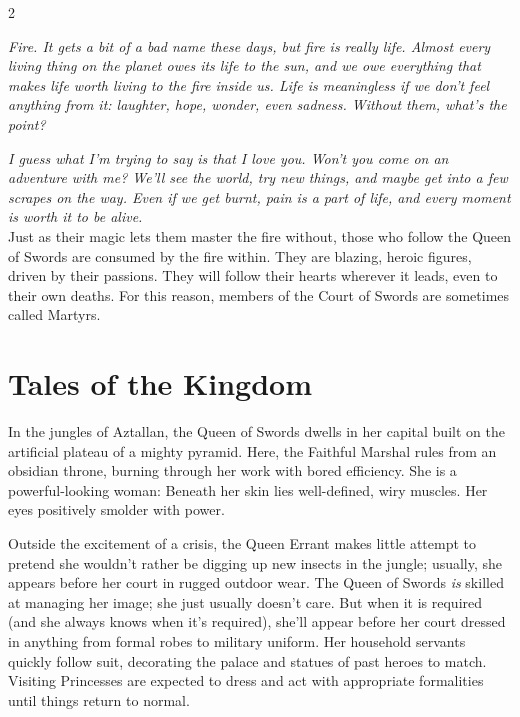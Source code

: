 \label{scha:Swords}\begin{multicols}{2}\raggedcolumns

\noindent \textit{Fire. It gets a bit of a bad name these days, but fire is really life. Almost every living thing on the planet owes its life to the sun, and we owe everything that makes life worth living to the fire inside us. Life is meaningless if we don't feel anything from it: laughter, hope, wonder, even sadness. Without them, what's the point?}

\textit{I guess what I'm trying to say is that I love you. Won't you come on an adventure with me? We'll see the world, try new things, and maybe get into a few scrapes on the way. Even if we get burnt, pain is a part of life, and every moment is worth it to be alive.}\\

\noindent Just as their magic lets them master the fire without, those who follow the Queen of Swords are consumed by the fire within. They are blazing, heroic figures, driven by their passions. They will follow their hearts wherever it leads, even to their own deaths. For this reason, members of the Court of Swords are sometimes called Martyrs. 

\section*{Tales of the Kingdom}

In the jungles of Aztallan, the Queen of Swords dwells in her capital built on the artificial plateau of a mighty pyramid. Here, the Faithful Marshal rules from an obsidian throne, burning through her work with bored efficiency. She is a powerful-looking woman: Beneath her skin lies well-defined, wiry muscles. Her eyes positively smolder with power. 

Outside the excitement of a crisis, the Queen Errant makes little attempt to pretend she wouldn't rather be digging up new insects in the jungle; usually, she appears before her court in rugged outdoor wear. The Queen of Swords \textit{is} skilled at managing her image; she just usually doesn't care. But when it is required (and she always knows when it's required), she'll appear before her court dressed in anything from formal robes to military uniform. Her household servants quickly follow suit, decorating the palace and statues of past heroes to match. Visiting Princesses are expected to dress and act with appropriate formalities until things return to normal.


\end{multicols}
